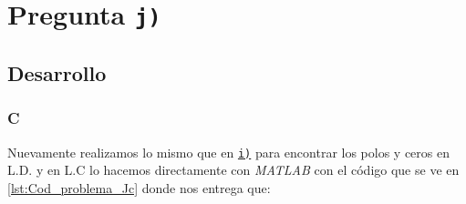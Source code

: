 \section{Pregunta \texttt{j)}}\label{pregunta-j}
\subsection{Desarrollo}

\subsubsection{C} %

Nuevamente realizamos lo mismo que en  \hyperref[pregunta-i]{\texttt{i)}} para encontrar los polos y ceros en L.D. y en L.C lo hacemos directamente con \textit{MATLAB} con el código que se ve en \autoref{lst:Cod_problema_Jc} donde nos entrega que:

